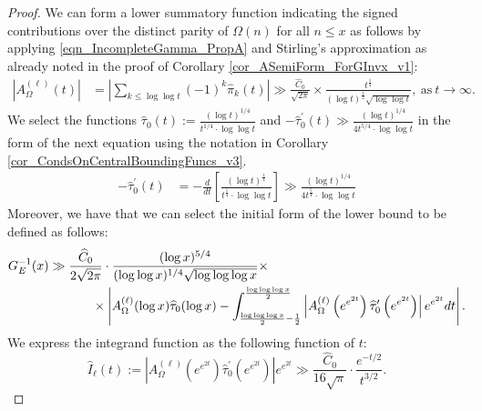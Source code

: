 \documentclass[11pt,reqno,a4letter]{article}
\numberwithin{figure}{section}
\numberwithin{table}{section}
\theoremstyle{plain}
\numberwithin{theorem}{section}
\theoremstyle{definition}
\newcommand{\SuccSim}[0]{\overset{_{\scriptsize{\blacktriangle}}}{\succsim}}
\renewcommand{\SuccSim}[0]{\ensuremath{\gg}}
\begin{document}
\begin{proof} 
We can form a lower summatory function indicating the signed contributions over the distinct 
parity of $\Omega(n)$ for all $n \leq x$ as follows by applying 
\eqref{eqn_IncompleteGamma_PropA} and Stirling's approximation as already noted in the 
proof of Corollary \ref{cor_ASemiForm_ForGInvx_v1}: 
\begin{align} 
\label{proof_thm_GInvFunc_v0} 
\left\lvert A_{\Omega}^{(\ell)}(t) \right\rvert & = 
     \left\lvert \sum_{k \leq \log\log t} (-1)^k \widehat{\pi}_k(t) \right\rvert 
     \gg \frac{\widehat{C}_0}{\sqrt{2\pi}} \times 
     \frac{t^{\frac{1}{4}}}{(\log t)^{\frac{1}{2}} \sqrt{\log\log t}}, 
     \mathrm{\ as\ } t \rightarrow \infty. 
\end{align} 
We select the functions 
$\widehat{\tau}_0(t) := \frac{(\log t)^{1/4}}{t^{1/4} \cdot \log\log t}$ and 
$-\widehat{\tau}^{\prime}_0(t) \gg \frac{(\log t)^{1/4}}{4 t^{5/4} \cdot \log\log t}$ 
in the form of the next equation using 
the notation in Corollary \ref{cor_CondsOnCentralBoundingFuncs_v3}. 
\begin{align} 
\label{eqn_HatTauPrimet_summation_weight_func_exp_v2} 
-\widehat{\tau}_0^{\prime}(t) & = -\frac{d}{dt}\left[ 
     \frac{(\log t)^{\frac{1}{4}}}{t^{\frac{1}{4}} \cdot \log\log t} 
     \right] \SuccSim \frac{(\log t)^{1/4}}{4 t^{\frac{5}{4}} \cdot \log\log t} 
\end{align} 
Moreover, we have that we can select 
the initial form of the lower bound to be defined as follows: 
\begin{align} 
\label{proof_thm_GInvFunc_v1} 
G_{E}^{-1}(x) & \gg \frac{\widehat{C}_0}{2 \sqrt{2\pi}} \cdot 
     \frac{(\log x)^{5/4}}{(\log\log x)^{1/4} \sqrt{\log\log\log x}} \times \\ 
\notag 
     & \phantom{:=\qquad\ } \times 
     \left\lvert A_{\Omega}^{(\ell)}(\log x) \widehat{\tau}_0(\log x) - 
     \int_{\frac{\log\log\log x}{2}-\frac{1}{2}}^{\frac{\log\log\log x}{2}} 
     \left\lvert 
     A_{\Omega}^{(\ell)}\left(e^{e^{2t}}\right) \widehat{\tau}_0^{\prime}\left(e^{e^{2t}}\right) 
     \right\rvert e^{e^{2t}} dt 
     \right\rvert. 
\end{align} 
We express the integrand function as the following function of $t$: 
\begin{equation} 
\label{eqn_proof_thm_GInvFunc_v3v2_approx} 
\widehat{I}_{\ell}(t) := \left\lvert 
     A_{\Omega}^{(\ell)}\left(e^{e^{2t}}\right) \widehat{\tau}_0^{\prime}\left(e^{e^{2t}}\right) 
     \right\rvert e^{e^{2t}} \gg \frac{\widehat{C}_0}{16 \sqrt{\pi}} \cdot \frac{e^{-t/2}}{t^{3/2}}. 

\end{equation}
\end{proof}
\end{document}
